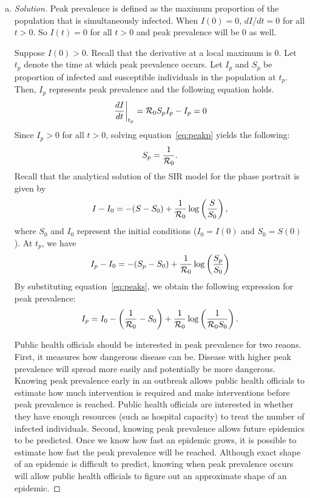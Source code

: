 \documentclass[12pt]{article}
\begin{document}
\basicSIRanalIntro
\begin{enumerate}[(a)]
\item \basicSIRanalQa

{\color{blue}
\begin{proof}[Solution]
Peak prevalence is defined as the maximum proportion of the population that is simultaneously infected. 
When $I(0) = 0$, $dI/dt = 0$ for all $t > 0$. So $I(t) = 0$ for all $t > 0$ and peak prevalence will be 0 as well.

Suppose $I(0) > 0$.
Recall that the derivative at a local maximum is 0. Let $t_p$ denote the time at which peak prevalence occurs. Let ${I}_p$ and ${S}_p$ be proportion of infected and susceptible individuals in the population at $t_p$. Then, ${I}_p$ represents peak prevalence and the following equation holds.
\begin{equation}
\left.\frac{dI}{dt}\right|_{t_p} = {\cal R}_0 S_p I_p - I_p = 0
\label{eq:peakp}
\end{equation}
Since $I_p > 0$ for all $t>0$, solving equation~\eqref{eq:peakp} yields the following:
\begin{equation}
S_p = \frac{1}{{\cal R}_0}.
\label{eq:peaks}
\end{equation}
Recall that the analytical solution of the SIR model for the phase portrait is given by
\begin{equation*}
I - I_0 = -(S - S_0) + \frac{1}{{\cal R}_0} \log \left(\frac{S}{S_0}\right),
\end{equation*}
where $S_0$ and $I_0$ represent the initial conditions ($I_0 = I(0)$ and $S_0 = S(0)$).
At $t_p$, we have
\begin{equation*}
I_p - I_0 = -(S_p - S_0) + \frac{1}{{\cal R}_0} \log \left(\frac{S_p}{S_0}\right)
\end{equation*}
By substituting equation~\eqref{eq:peaks}, we obtain the following expression for peak prevalence:
\begin{equation*}
I_p = I_0 - \left(\frac{1}{{\cal R}_0} - S_0\right) + \frac{1}{{\cal R}_0} \log \left( \frac{1}{{\cal R}_0 S_0}\right).
\end{equation*}

Public health officials should be interested in peak prevalence for two reaons.
First, it measures how dangerous disease can be. 
Disease with higher peak prevalence will spread more easily and potentially be more dangerous.
Knowing peak prevalence early in an outbreak allows public health officials to estimate how much intervention is required and make interventions before peak prevalence is reached. Public health officials are interested in whether they have enough resources (such as hospital capacity) to treat the number of infected individuals.
Second, knowing peak prevalence allows future epidemics to be predicted.
Once we know how fast an epidemic grows, it is possible to estimate how fast the peak prevalence will be reached. 
Although exact shape of an epidemic is difficult to predict, knowing when peak prevalence occurs will allow public health officials to figure out an approximate shape of an epidemic.
\end{proof}
}


\end{enumerate}
\end{document}

